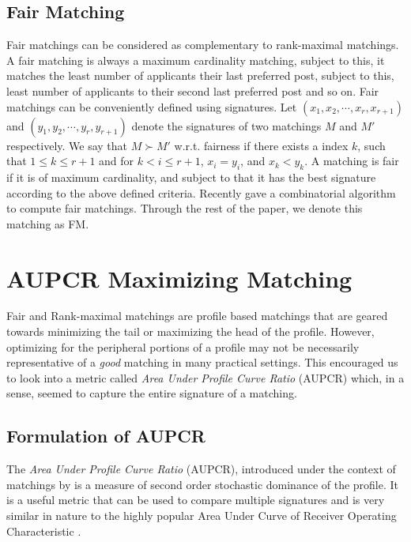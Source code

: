 \documentclass[letterpaper]{article} %
\begin{document}
\subsection{Fair Matching}
Fair matchings can be considered as complementary to rank-maximal matchings. A fair matching is always a maximum cardinality matching, subject to this, it matches the least number of applicants their last preferred post, subject to this, least number of applicants to their second last
preferred post and so on. Fair matchings can be conveniently defined using signatures.
Let $(x_1, x_2,\cdots, x_r, x_{r+1})$ and $(y_1, y_2,\cdots, y_r, y_{r+1})$ denote
the signatures of two matchings  $M$ and $M'$ respectively. We say that $M \succ M'$ w.r.t. fairness
if there exists a index $k$, such that $1 \le k \le r+1$ and
for $k < i \le r+1$, $x_i = y_i$, and $x_k < y_k$.
A matching is fair if it is of maximum cardinality, and subject to that it has the best signature according to the above defined criteria.
Recently  \cite{fair} gave a combinatorial algorithm to compute fair matchings.
Through the rest of the paper, we denote this matching as FM.



\section{AUPCR Maximizing Matching}
Fair and Rank-maximal matchings are profile based matchings that are geared towards minimizing the tail or maximizing the head of the profile. However, optimizing for the peripheral portions of a profile may not be necessarily representative of a \textit{good} matching in many practical settings. This encouraged us to look into a metric called \textit{Area Under Profile Curve Ratio} (AUPCR) which, in a sense, seemed to capture the entire signature of a matching.
\subsection{Formulation of AUPCR}
The \textit{Area Under Profile Curve Ratio} (AUPCR), introduced under the context of matchings by \cite{experiment2} is a measure of second order stochastic dominance of the profile. It is a useful metric that can be used to compare multiple signatures and is very similar in nature to the highly popular Area Under Curve of Receiver Operating Characteristic \cite{roc}.
\end{document}
